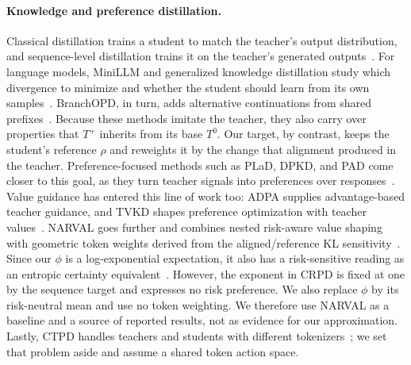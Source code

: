 \documentclass[pdflatex,sn-mathphys-num,review]{sn-jnl}
\theoremstyle{thmstyleone}
\theoremstyle{thmstyletwo}
\theoremstyle{thmstylethree}
\providecommand{\Tp}{T^{+}}
\providecommand{\Tz}{T^{0}}
\begin{document}
\paragraph{Knowledge and preference distillation.}
Classical distillation trains a student to match the teacher's output distribution, and sequence-level distillation trains it on the teacher's generated outputs~\citep{hinton2015distilling,kim2016sequence}. For language models, MiniLLM and generalized knowledge distillation study which divergence to minimize and whether the student should learn from its own samples~\citep{gu2024minillm,agarwal2024policy}. BranchOPD, in turn, adds alternative continuations from shared prefixes~\citep{chen2026branchopd}. Because these methods imitate the teacher, they also carry over properties that $\Tp$ inherits from its base $\Tz$. Our target, by contrast, keeps the student's reference $\rho$ and reweights it by the change that alignment produced in the teacher. Preference-focused methods such as PLaD, DPKD, and PAD come closer to this goal, as they turn teacher signals into preferences over responses~\citep{zhang2024plad,li2024direct,gu2025capturing}. Value guidance has entered this line of work too: ADPA supplies advantage-based teacher guidance, and TVKD shapes preference optimization with teacher values~\citep{gao2025advantage,kwon2025preference}. NARVAL goes further and combines nested risk-aware value shaping with geometric token weights derived from the aligned/reference KL sensitivity~\citep{van2026narval}. Since our $\phi$ is a log-exponential expectation, it also has a risk-sensitive reading as an entropic certainty equivalent~\citep{howard1972risk}. However, the exponent in CRPD is fixed at one by the sequence target and expresses no risk preference. We also replace $\phi$ by its risk-neutral mean and use no token weighting. We therefore use NARVAL as a baseline and a source of reported results, not as evidence for our approximation. Lastly, CTPD handles teachers and students with different tokenizers~\citep{truong2026ctpd}; we set that problem aside and assume a shared token action space.
\end{document}
